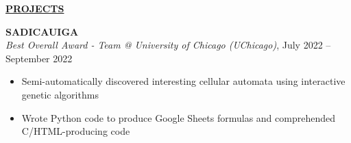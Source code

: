 \documentclass[
]{article}
\providecommand{\tightlist}{%
  \setlength{\itemsep}{0pt}\setlength{\parskip}{0pt}}
\begin{document}
\textbf{\underline{PROJECTS}}




\textbf{SADICAUIGA} \\
\emph{Best Overall Award - Team @ University of Chicago (UChicago)}, July 2022 -- September 2022 %
\begin{itemize}
\tightlist
\item
Semi-automatically discovered interesting cellular automata using interactive genetic algorithms
\end{itemize}

\begin{itemize}
\tightlist
\item
Wrote Python code to produce Google Sheets formulas and comprehended C/HTML-producing code
\end{itemize}









\end{document}

